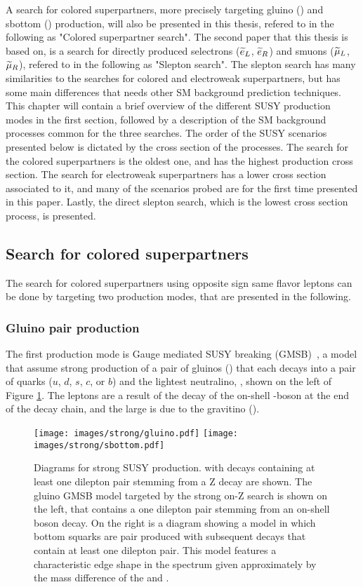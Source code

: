 A search for colored superpartners, more precisely targeting gluino (\gluino) and sbottom (\sbottom) production, will also be presented in this thesis, refered to in the following as "Colored superpartner search".
The second paper that this thesis is based on, is a search for directly produced selectrons ($\widetilde{e}_{L}$, $\widetilde{e}_{R}$) and smuons ($\widetilde{\mu}_{L}$, $\widetilde{\mu}_{R}$), refered to in the following as "Slepton search". 
The slepton search has many similarities to the searches for colored and electroweak superpartners, but has some main differences that needs other SM background prediction techniques. 
This chapter will contain a brief overview of the different SUSY production modes in the first section, followed by a description of the SM background processes common for the three searches. 
The order of the SUSY scenarios presented below is dictated by the cross section of the processes. 
The search for the colored superpartners is the oldest one, and has the highest production cross section. 
The search for electroweak superpartners has a lower cross section associated to it, and many of the scenarios probed are for the first time presented in this paper. 
Lastly, the direct slepton search, which is the lowest cross section process, is presented. 
\subsection*{Search for colored superpartners}\label{sec:searchStrong}
\noindent\justify
The search for colored superpartners using opposite sign same flavor leptons can be done by targeting two production modes, that are presented in the following. 
\subsubsection*{Gluino pair production}
\noindent\justify
The first production mode is Gauge mediated SUSY breaking (GMSB)~\cite{Matchev:1999ft,Meade:2009qv,Ruderman}, a model that assume strong production of a pair of gluinos (\gluino) that each decays into a pair of quarks ($u$, $d$, $s$, $c$, or $b$) and the lightest neutralino, \PSGczDo, shown on the left of Figure \ref{fig:feynmanStrong}. 
The leptons are a result of the decay of the on-shell \PZ-boson at the end of the decay chain, and the large \ptmiss is due to the gravitino (\gravitino). 
\begin{figure}[!htp]
\centering
\texttt{[image: images/strong/gluino.pdf]}
\texttt{[image: images/strong/sbottom.pdf]}
\caption{Diagrams for strong SUSY production.  
with decays containing at least one dilepton pair stemming from a Z decay are shown. 
The gluino GMSB model targeted by the strong on-Z search is shown on the left, that contains a one dilepton pair stemming from an on-shell \PZ boson decay. On the right is a diagram showing a model in which bottom squarks are pair produced with subsequent decays that contain at least one dilepton pair. This model features a characteristic edge shape in the \mll spectrum given approximately by the mass difference of the \PSGczDt and \PSGczDo.}
\label{fig:feynmanStrong}
\end{figure}                                                                                                                                          
